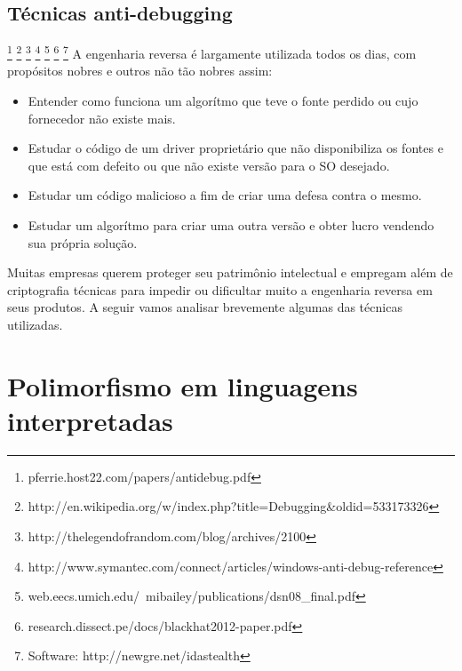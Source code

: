 \subsection{Técnicas anti-debugging} 
\footnote{pferrie.host22.com/papers/antidebug.pdf}
\footnote{http://en.wikipedia.org/w/index.php?title=Debugging\&oldid=533173326} 
\footnote{http://thelegendofrandom.com/blog/archives/2100} 
\footnote{http://www.symantec.com/connect/articles/windows-anti-debug-reference}
\footnote{web.eecs.umich.edu/~mibailey/publications/dsn08\_final.pdf} 
\footnote{research.dissect.pe/docs/blackhat2012-paper.pdf}
\footnote{Software: http://newgre.net/idastealth}
A engenharia reversa é largamente utilizada todos os dias, com propósitos nobres e outros não tão nobres assim:
\begin{itemize}
 \item Entender como funciona um algorítmo que teve o fonte perdido ou cujo fornecedor não existe mais.
 \item Estudar o código de um driver proprietário que não disponibiliza os fontes e que está com defeito ou que não existe versão para o SO desejado. 
 \item Estudar um código malicioso a fim de criar uma defesa contra o mesmo.
 \item Estudar um algorítmo para criar uma outra versão e obter lucro vendendo sua própria solução.
\end{itemize}

Muitas empresas querem proteger seu patrimônio intelectual e empregam além de criptografia técnicas para impedir ou dificultar muito a engenharia reversa em seus produtos. A seguir vamos analisar brevemente algumas das técnicas utilizadas. 


\section{Polimorfismo em linguagens interpretadas}
